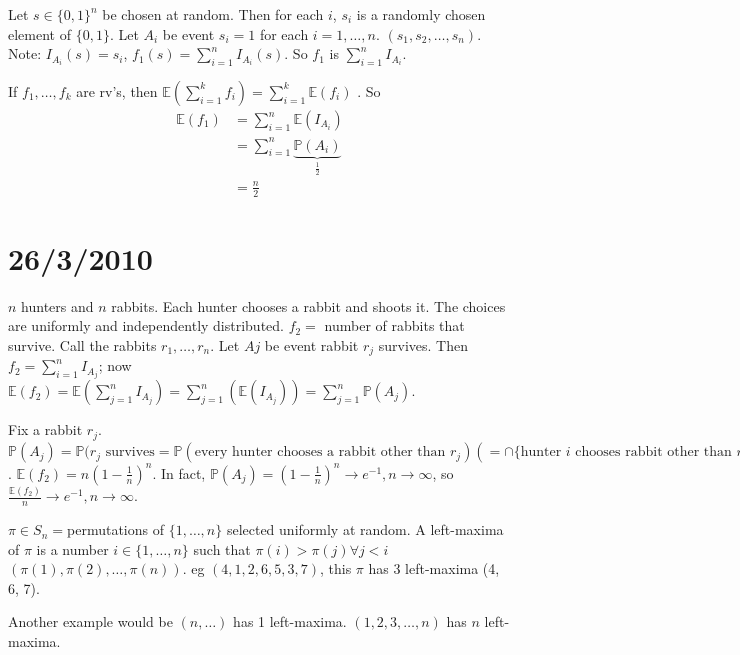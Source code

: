 \documentclass{article}
\begin{document}
Let $s \in \{0,1\}^n$ be chosen at random.  Then for each $i$, $s_i$ is a randomly chosen element of $\{0,1\}$.  Let $A_i$ be event $s_i = 1$ for each $i = 1, \ldots, n$.  $(s_1, s_2, \ldots, s_n)$.  Note: $I_{A_i} (s) = s_i$, $f_1(s)  = \sum_{i=1}^n I_{A_i}(s)$.  So $f_1$ is $\sum_{i=1}^n I_{A_i}$.

If $f_1, \ldots, f_k$ are rv's, then $\mathbb{E}(\sum_{i=1}^k f_i) =  \sum_{i=1}^k \mathbb{E}(f_i)$  .  So 
\begin{align*}
\mathbb{E}(f_1) &= \sum_{i=1}^n \mathbb{E}(I_{A_i}) \\
& = \sum_{i=1}^n \underbrace{\mathbb{P}(A_i)}_{\frac{1}{2}} \\
&= \frac{n}{2}
\end{align*}

\section*{26/3/2010}

$n$ hunters and $n$ rabbits.  Each hunter chooses a rabbit and shoots it.  The choices are uniformly and independently distributed.  $f_2=$ number of rabbits that survive.  Call the rabbits $r_1, \ldots, r_n$.  Let $Aj$ be event rabbit $r_j$ survives.  Then $f_2 = \sum_{i=1}^n I_{A_j}$; now $\mathbb{E}(f_2) = \mathbb{E}(\sum_{j=1}^n I_{A_j})= \sum_{j=1}^n (\mathbb{E}(I_{A_j}))= \sum_{j=1}^n \mathbb{P}(A_j)$.

Fix a rabbit $r_j$.  $\mathbb{P}(A_j)= \mathbb{P} (r_j \text{ survives}  = \mathbb{P} (\text{every hunter chooses a rabbit other than }r_j) (=\cap \{\text{hunter $i$ chooses rabbit other than }r_j\}) = \prod_{i=1}^n \mathbb{P} (\text{hunter $i$ chooses rabbit other than }r_j) = \prod_{i=1}^n (1 - \frac{1}{n}) = (1-\frac{1}{n})^n$.  $\mathbb{E}(f_2) = n (1-\frac{1}{n})^n$.  In fact, $\mathbb{P}(A_j) = (1- \frac{1}{n})^n \rightarrow e^{-1}, n\rightarrow \infty$, so $\frac{\mathbb{E}(f_2)}{n} \rightarrow e^{-1}, n \rightarrow \infty$.

$\pi \in S_n = ${permutations of $\{1, \ldots, n\}$} selected uniformly at random.  A left-maxima of $\pi$ is a number $i \in \{1,\ldots, n\}$ such that $\pi(i) >\pi(j) \forall j< i$ $(\pi(1), \pi(2), \ldots, \pi(n))$.  eg $(4,1,2,6,5,3,7)$, this $\pi$ has 3 left-maxima (4, 6, 7).

\begin{examp}
Another example would be $(n, \ldots )$ has 1 left-maxima.  $(1,2,3, \ldots, n)$ has $n$ left-maxima. 
\end{examp}
\end{document}
